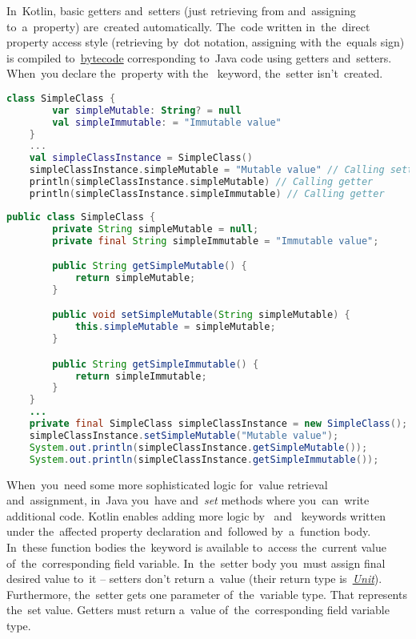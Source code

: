 \label{kotlingetset}
In~Kotlin, basic getters and~setters (just retrieving from and~assigning to~a~property) are~created automatically.
The~code written in~the~direct property access style (retrieving by~dot notation, assigning with the~equals sign) is compiled to~\hyperref[javabytecode]{bytecode} corresponding to~Java code using getters and~setters.
When~you declare the~property with the~ keyword, the~setter isn't~created.

\example
\begin{lstlisting}[language=Kotlin, title={Direct property access in Kotlin}]
    class SimpleClass {
        var simpleMutable: String? = null
        val simpleImmutable: = "Immutable value"
    }
    ...
    val simpleClassInstance = SimpleClass()
    simpleClassInstance.simpleMutable = "Mutable value" // Calling setter
    println(simpleClassInstance.simpleMutable) // Calling getter
    println(simpleClassInstance.simpleImmutable) // Calling getter
\end{lstlisting}
\newpage

\begin{lstlisting}[language=Java, title={Java equivalent}]
    public class SimpleClass {
        private String simpleMutable = null;
        private final String simpleImmutable = "Immutable value";

        public String getSimpleMutable() {
            return simpleMutable;
        }

        public void setSimpleMutable(String simpleMutable) {
            this.simpleMutable = simpleMutable;
        }

        public String getSimpleImmutable() {
            return simpleImmutable;
        }
    }
    ...
    private final SimpleClass simpleClassInstance = new SimpleClass();
    simpleClassInstance.setSimpleMutable("Mutable value");
    System.out.println(simpleClassInstance.getSimpleMutable());
    System.out.println(simpleClassInstance.getSimpleImmutable());
\end{lstlisting}
\newline

\noindent When~you~need some more sophisticated logic for~value retrieval and~assignment, in~Java you~have  \mbox{and \textit{set}} methods where you~can~write additional code.
Kotlin enables adding more logic \mbox{by } \mbox{and } keywords written under the~affected property declaration and~followed by~a~function body.
In~these function bodies the~keyword  is available to~access the~current value of~the~corresponding field variable.
In~the~setter body you~must assign final desired value to~it -- setters don't return a~value (their return type \mbox{is \hyperref[kotlinunit]{\textit{Unit}}}).
Furthermore, the~setter gets one parameter of~the~variable type.
That represents the~set value.
Getters must return a~value of~the~corresponding field variable type.
\newpage


